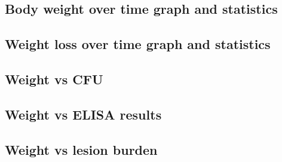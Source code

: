 \documentclass[
]{book}
\newenvironment{Shaded}{\begin{snugshade}}{\end{snugshade}}
\newcommand{\CommentTok}[1]{\textcolor[rgb]{0.56,0.35,0.01}{\textit{#1}}}
\newcommand{\FunctionTok}[1]{\textcolor[rgb]{0.00,0.00,0.00}{#1}}
\newcommand{\NormalTok}[1]{#1}
\newcommand{\OtherTok}[1]{\textcolor[rgb]{0.56,0.35,0.01}{#1}}
\newcommand{\SpecialCharTok}[1]{\textcolor[rgb]{0.00,0.00,0.00}{#1}}
\newcommand{\StringTok}[1]{\textcolor[rgb]{0.31,0.60,0.02}{#1}}
\begin{document}
\begin{Shaded}
\end{Shaded}

\begin{Shaded}
\end{Shaded}

\hypertarget{body-weight-over-time-graph-and-statistics}{%
\subsection{Body weight over time graph and statistics}\label{body-weight-over-time-graph-and-statistics}}

\hypertarget{weight-loss-over-time-graph-and-statistics}{%
\subsection{Weight loss over time graph and statistics}\label{weight-loss-over-time-graph-and-statistics}}

\hypertarget{weight-vs-cfu}{%
\subsection{Weight vs CFU}\label{weight-vs-cfu}}

\hypertarget{weight-vs-elisa-results}{%
\subsection{Weight vs ELISA results}\label{weight-vs-elisa-results}}

\hypertarget{weight-vs-lesion-burden}{%
\subsection{Weight vs lesion burden}\label{weight-vs-lesion-burden}}
\end{document}
